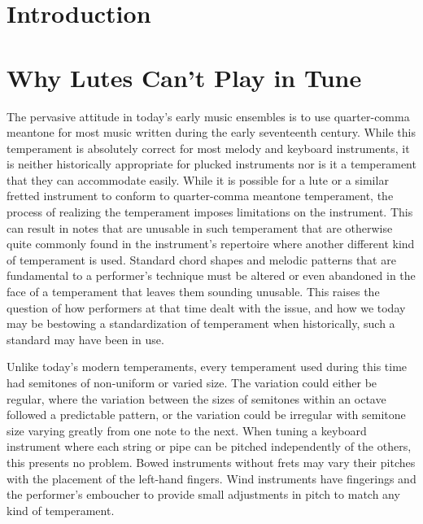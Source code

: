 
\section*{Introduction}

\section{Why Lutes Can't Play in Tune}

The pervasive attitude in today's early music ensembles is to use quarter-comma meantone
for most music written during the early seventeenth century. While this temperament is
absolutely correct for most melody and keyboard instruments, it is neither historically
appropriate for plucked instruments nor is it a temperament that they can accommodate
easily.  While it is possible for a lute or a similar fretted instrument to conform to
quarter-comma meantone temperament, the process of realizing the temperament imposes
limitations on the instrument.  This can result in notes that are unusable in such
temperament that are otherwise quite commonly found in the instrument's repertoire where
another different kind of temperament is used.  Standard chord shapes and melodic patterns
that are fundamental to a performer's technique must be altered or even abandoned in the
face of a temperament that leaves them sounding unusable.  This raises the question of how
performers at that time dealt with the issue, and how we today may be bestowing a
standardization of temperament when historically, such a standard may have been in use.

Unlike today's modern temperaments, every temperament used during this time had semitones
of non-uniform or varied size.  The variation could either be regular, where the variation
between the sizes of semitones within an octave followed a predictable pattern, or the
variation could be irregular with semitone size varying greatly from one note to the next.
When tuning a keyboard instrument where each string or pipe can be pitched independently
of the others, this presents no problem.  Bowed instruments without frets may vary their
pitches with the placement of the left-hand fingers.  Wind instruments have fingerings and
the performer's emboucher to provide small adjustments in pitch to match any kind of
temperament.

